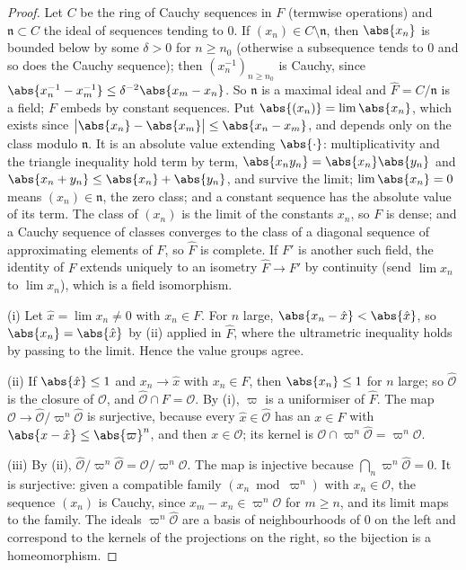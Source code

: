 \begin{proof}
Let $C$ be the ring of Cauchy sequences in $F$ (termwise operations) and $\mathfrak n\subset C$ the ideal of sequences tending to $0$. If
$(x_n)\in C\setminus\mathfrak n$, then $\abs{x_n}$ is bounded below by some $\delta>0$ for $n\ge n_0$ (otherwise a subsequence tends to $0$ and so
does the Cauchy sequence); then $(x_n^{-1})_{n\ge n_0}$ is Cauchy, since $\abs{x_n^{-1}-x_m^{-1}}\le\delta^{-2}\abs{x_m-x_n}$. So $\mathfrak n$ is a
maximal ideal and $\hat F=C/\mathfrak n$ is a field; $F$ embeds by constant sequences. Put $\abs{(x_n)}=\lim\abs{x_n}$, which exists since
$\bigl\lvert\abs{x_n}-\abs{x_m}\bigr\rvert\le\abs{x_n-x_m}$, and depends only on the class modulo $\mathfrak n$. It is an absolute value extending
$\abs{\cdot}$: multiplicativity and the triangle inequality hold term by term, $\abs{x_ny_n}=\abs{x_n}\abs{y_n}$ and $\abs{x_n+y_n}\le\abs{x_n}+\abs{y_n}$,
and survive the limit; $\lim\abs{x_n}=0$ means $(x_n)\in\mathfrak n$, the zero class; and a constant sequence has the absolute value of its term. The class of $(x_n)$ is the limit of the constants $x_n$, so $F$ is dense; and a Cauchy sequence of classes converges to the
class of a diagonal sequence of approximating elements of $F$, so $\hat F$ is complete. If $F'$ is another such field, the identity of $F$
extends uniquely to an isometry $\hat F\to F'$ by continuity (send $\lim x_n$ to $\lim x_n$), which is a field isomorphism.

(i) Let $\hat x=\lim x_n\ne0$ with $x_n\in F$. For $n$ large, $\abs{x_n-\hat x}<\abs{\hat x}$, so $\abs{x_n}=\abs{\hat x}$ by
(ii) applied in $\hat F$, where the ultrametric inequality holds by passing to the limit. Hence the value
groups agree.

(ii) If $\abs{\hat x}\le1$ and $x_n\to\hat x$ with $x_n\in F$, then $\abs{x_n}\le1$ for $n$ large; so $\hat{\mathcal O}$ is the closure of $\mathcal O$,
and $\hat{\mathcal O}\cap F=\mathcal O$. By (i), $\varpi$ is a uniformiser of $\hat F$. The map $\mathcal O\to\hat{\mathcal O}/\varpi^n\hat{\mathcal O}$ is
surjective, because every $\hat x\in\hat{\mathcal O}$ has an $x\in F$ with $\abs{x-\hat x}\le\abs{\varpi}^n$, and then $x\in\mathcal O$; its kernel is
$\mathcal O\cap\varpi^n\hat{\mathcal O}=\varpi^n\mathcal O$.

(iii) By (ii), $\hat{\mathcal O}/\varpi^n\hat{\mathcal O}=\mathcal O/\varpi^n\mathcal O$. The map is injective because $\bigcap_n\varpi^n\hat{\mathcal O}=0$. It is
surjective: given a compatible family $(x_n\bmod\varpi^n)$ with $x_n\in\mathcal O$, the sequence $(x_n)$ is Cauchy, since $x_{m}-x_n\in\varpi^n\mathcal O$
for $m\ge n$, and its limit maps to the family. The ideals $\varpi^n\hat{\mathcal O}$ are a basis of neighbourhoods of $0$ on the left and
correspond to the kernels of the projections on the right, so the bijection is a homeomorphism.
\end{proof}

